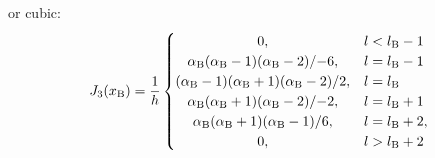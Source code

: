 \documentclass[twoside,a4paper]{article}
\begin{document}
or cubic:
\begin{equation}\label{eq:cubicInterpolation}
     J_3(x_\text{B}) = \frac{1}{h}
     \begin{cases}
    \hfil 0, & l < l_{\text{B}} - 1\\
    \hfil \alpha_\text{B}(\alpha_\text{B}-1)(\alpha_\text{B} - 2)/{-6}, & l = l_{\text{B}} - 1\\
    \hfil (\alpha_\text{B}-1)(\alpha_\text{B}+1)(\alpha_\text{B}-2)/2, & l = l_{\text{B}}\\
    \hfil \alpha_\text{B}(\alpha_\text{B}+1)(\alpha_\text{B} - 2)/{-2}, & l = l_{\text{B}} + 1\\
    \hfil \alpha_\text{B}(\alpha_\text{B}+1)(\alpha_\text{B} - 1)/6, & l = l_{\text{B}} +2,\\
    \hfil 0, & l > l_\text{B} + 2
\end{cases}
\end{equation}
\end{document}
